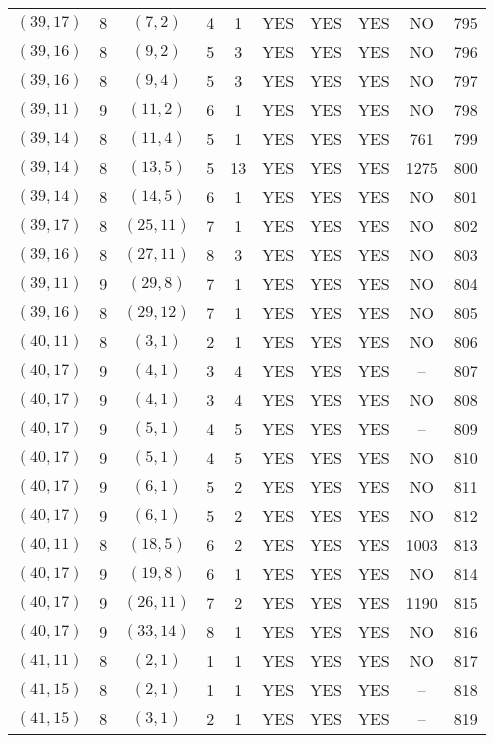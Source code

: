 \begin{longtable}{|c|c|c|c|c|c|c|c|c|c|}
$(39, 17)$ & 8 & $(7, 2)$ & 4 & 1 & YES & YES & YES & NO & 795\\
$(39, 16)$ & 8 & $(9, 2)$ & 5 & 3 & YES & YES & YES & NO & 796\\
$(39, 16)$ & 8 & $(9, 4)$ & 5 & 3 & YES & YES & YES & NO & 797\\
$(39, 11)$ & 9 & $(11, 2)$ & 6 & 1 & YES & YES & YES & NO & 798\\
$(39, 14)$ & 8 & $(11, 4)$ & 5 & 1 & YES & YES & YES & 761 & 799\\
$(39, 14)$ & 8 & $(13, 5)$ & 5 & 13 & YES & YES & YES & 1275 & 800\\
$(39, 14)$ & 8 & $(14, 5)$ & 6 & 1 & YES & YES & YES & NO & 801\\
$(39, 17)$ & 8 & $(25, 11)$ & 7 & 1 & YES & YES & YES & NO & 802\\
$(39, 16)$ & 8 & $(27, 11)$ & 8 & 3 & YES & YES & YES & NO & 803\\
$(39, 11)$ & 9 & $(29, 8)$ & 7 & 1 & YES & YES & YES & NO & 804\\
$(39, 16)$ & 8 & $(29, 12)$ & 7 & 1 & YES & YES & YES & NO & 805\\
$(40, 11)$ & 8 & $(3, 1)$ & 2 & 1 & YES & YES & YES & NO & 806\\
$(40, 17)$ & 9 & $(4, 1)$ & 3 & 4 & YES & YES & YES & -- & 807\\
$(40, 17)$ & 9 & $(4, 1)$ & 3 & 4 & YES & YES & YES & NO & 808\\
$(40, 17)$ & 9 & $(5, 1)$ & 4 & 5 & YES & YES & YES & -- & 809\\
$(40, 17)$ & 9 & $(5, 1)$ & 4 & 5 & YES & YES & YES & NO & 810\\
$(40, 17)$ & 9 & $(6, 1)$ & 5 & 2 & YES & YES & YES & NO & 811\\
$(40, 17)$ & 9 & $(6, 1)$ & 5 & 2 & YES & YES & YES & NO & 812\\
$(40, 11)$ & 8 & $(18, 5)$ & 6 & 2 & YES & YES & YES & 1003 & 813\\
$(40, 17)$ & 9 & $(19, 8)$ & 6 & 1 & YES & YES & YES & NO & 814\\
$(40, 17)$ & 9 & $(26, 11)$ & 7 & 2 & YES & YES & YES & 1190 & 815\\
$(40, 17)$ & 9 & $(33, 14)$ & 8 & 1 & YES & YES & YES & NO & 816\\
$(41, 11)$ & 8 & $(2, 1)$ & 1 & 1 & YES & YES & YES & NO & 817\\
$(41, 15)$ & 8 & $(2, 1)$ & 1 & 1 & YES & YES & YES & -- & 818\\
$(41, 15)$ & 8 & $(3, 1)$ & 2 & 1 & YES & YES & YES & -- & 819\\

\end{longtable}
